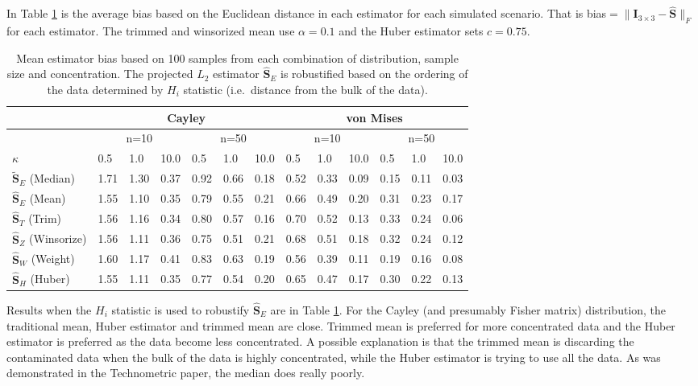 \documentclass{article}\usepackage[]{graphicx}\usepackage[]{color}
\newcommand{\ProjMean}{{\widehat{\bm S}_{E}}}
\newcommand{\ProjMedian}{{\widetilde{\bm S}_{E}}}
\newcommand{\HuberMean}{{\widehat{\bm S}_H}}
\newcommand{\WeightMean}{{\widehat{\bm S}_W}}
\newcommand{\TrimMean}{{\widehat{\bm S}_T}}
\newcommand{\WinzMean}{{\widehat{\bm S}_Z}}
\newcommand{\red}[1]{{\color{red} #1}}
\begin{document}
In Table \ref{tab:SimResHn} is the average bias based on the Euclidean distance in each estimator for each simulated scenario.  That is bias$=\|\bm I_{3\times 3}-\widehat{\bm S}\|_F$ for each estimator.  The trimmed and winsorized mean use $\alpha=0.1$ and the Huber estimator sets $c=0.75$.


\begin{table}[ht]
\centering
\begin{tabular}{l|lll|lll|lll|lll}
  \hline
 & \multicolumn{6}{|c|}{Cayley} & \multicolumn{6}{|c}{von Mises}   \\ 
\hline
   &  \multicolumn{3}{|c|}{n=10} & \multicolumn{3}{|c|}{n=50} & \multicolumn{3}{|c|}{n=10} & \multicolumn{3}{|c}{n=50} \\ 
  $\kappa$ &  0.5 &  1.0 & 10.0 &  0.5 &  1.0 & 10.0 &  0.5 &  1.0 & 10.0 &  0.5 &  1.0 & 10.0 \\ \hline
  $\ProjMedian$ (Median) & 1.71 & 1.30 & 0.37 & 0.92 & 0.66 & 0.18 & \red{0.52 }& \red{0.33} & \red{0.09} & \red{0.15} & \red{ 0.11} & \red{ 0.03} \\ 
  $\ProjMean$ (Mean) & \red{1.55} & \red{1.10} & 0.35 & 0.79 & 0.55 & 0.21 & 0.66 & 0.49 & 0.20 & 0.31 & 0.23 & 0.17 \\ 
  $\TrimMean$ (Trim) & 1.56 & 1.16 & \red{0.34} & 0.80 & 0.57 & \red{0.16} & 0.70 & 0.52 & 0.13 & 0.33 & 0.24 & 0.06 \\ 
  $\WinzMean$ (Winsorize)& 1.56 & 1.11 & 0.36 & \red{0.75} & \red{0.51} & 0.21 & 0.68 & 0.51 & 0.18 & 0.32& 0.24 & 0.12 \\ 
  $\WeightMean$ (Weight) & 1.60 & 1.17 & 0.41 & 0.83 & 0.63 & 0.19 & 0.56 & 0.39 & 0.11 & 0.19 & 0.16 & 0.08 \\ 
  $\HuberMean$ (Huber) & \red{1.55} & 1.11 & 0.35 & 0.77 & 0.54 & 0.20 & 0.65 & 0.47 & 0.17 & 0.30 & 0.22 & 0.13 \\ 
   \hline
\end{tabular}
\caption{Mean estimator bias based on 100 samples from each combination of distribution, sample size and concentration.  The projected $L_2$ estimator $\ProjMean$ is robustified based on the ordering of the data determined by $H_i$ statistic (i.e.~distance from the bulk of the data).}
\label{tab:SimResHn}
\end{table}

Results when the $H_i$ statistic is used to robustify $\ProjMean$ are in Table \ref{tab:SimResHn}.  For the Cayley (and presumably Fisher matrix) distribution, the traditional mean, Huber estimator and trimmed mean are close.  Trimmed mean is preferred for more concentrated data and the Huber estimator is preferred as the data become less concentrated.  A possible explanation is that the trimmed mean is discarding the contaminated data when the bulk of the data is highly concentrated, while the Huber estimator is trying to use all the data.  As was demonstrated in the Technometric paper, the median does really poorly.
\end{document}
